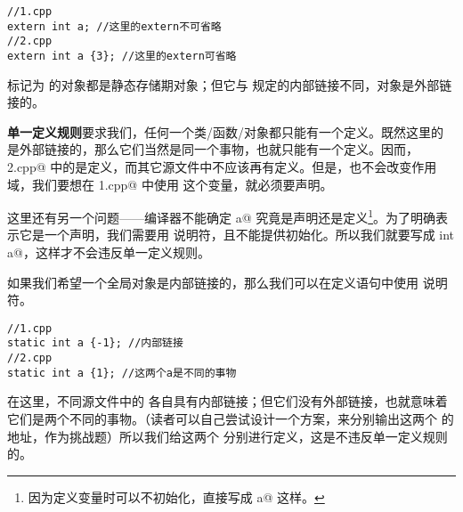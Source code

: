 \begin{lstlisting}
//1.cpp
extern int a; //这里的extern不可省略
//2.cpp
extern int a {3}; //这里的extern可省略
\end{lstlisting}
标记为 \lstinline@extern@ 的对象都是静态存储期对象；但它与 \lstinline@static@ 规定的内部链接不同，\lstinline@extern@ 对象是外部链接的。\par
\textbf{单一定义规则}要求我们，任何一个类/函数/对象都只能有一个定义。既然这里的 \lstinline@a@ 是外部链接的，那么它们当然是同一个事物，也就只能有一个定义。因而，\lstinline@2.cpp@ 中的是定义，而其它源文件中不应该再有定义。但是，\lstinline@extern@ 也不会改变作用域，我们要想在 \lstinline@1.cpp@ 中使用 \lstinline@a@ 这个变量，就必须要声明。\par
这里还有另一个问题——编译器不能确定 \lstinline@int a@ 究竟是声明还是定义\footnote{因为定义变量时可以不初始化，直接写成 \lstinline@int a@ 这样。}。为了明确表示它是一个声明，我们需要用 \lstinline@extern@ 说明符，且不能提供初始化。所以我们就要写成 \lstinline@extern int a@，这样才不会违反单一定义规则。\par
如果我们希望一个全局对象是内部链接的，那么我们可以在定义语句中使用 \lstinline@static@ 说明符。
\begin{lstlisting}
//1.cpp
static int a {-1}; //内部链接
//2.cpp
static int a {1}; //这两个a是不同的事物
\end{lstlisting}
在这里，不同源文件中的 \lstinline@a@ 各自具有内部链接；但它们没有外部链接，也就意味着它们是两个不同的事物。（读者可以自己尝试设计一个方案，来分别输出这两个 \lstinline@a@ 的地址，作为挑战题）所以我们给这两个 \lstinline@a@ 分别进行定义，这是不违反单一定义规则的。\par
